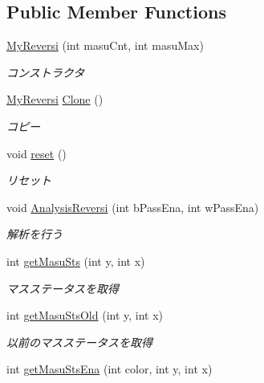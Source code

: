 \subsection*{Public Member Functions}
\begin{DoxyCompactItemize}
\item 
\hyperlink{class_reversi_form_1_1_my_reversi_ab8c7a345a2e1d0978afd640d052f3827}{My\+Reversi} (int masu\+Cnt, int masu\+Max)
\begin{DoxyCompactList}\small\item\em コンストラクタ \end{DoxyCompactList}\item 
\hyperlink{class_reversi_form_1_1_my_reversi}{My\+Reversi} \hyperlink{class_reversi_form_1_1_my_reversi_aa340f79c0f7bb78750c410ce73ca7b99}{Clone} ()
\begin{DoxyCompactList}\small\item\em コピー \end{DoxyCompactList}\item 
void \hyperlink{class_reversi_form_1_1_my_reversi_aa8d8e839466c63462954080353cd4a9e}{reset} ()
\begin{DoxyCompactList}\small\item\em リセット \end{DoxyCompactList}\item 
void \hyperlink{class_reversi_form_1_1_my_reversi_afc9513cbba4f973c7d1ee92e0a0f3288}{Analysis\+Reversi} (int b\+Pass\+Ena, int w\+Pass\+Ena)
\begin{DoxyCompactList}\small\item\em 解析を行う \end{DoxyCompactList}\item 
int \hyperlink{class_reversi_form_1_1_my_reversi_ab6498c154199b58c418af1e0058736f6}{get\+Masu\+Sts} (int y, int x)
\begin{DoxyCompactList}\small\item\em マスステータスを取得 \end{DoxyCompactList}\item 
int \hyperlink{class_reversi_form_1_1_my_reversi_abd6f4b9d6355af3175ac885731338705}{get\+Masu\+Sts\+Old} (int y, int x)
\begin{DoxyCompactList}\small\item\em 以前のマスステータスを取得 \end{DoxyCompactList}\item 
int \hyperlink{class_reversi_form_1_1_my_reversi_ae8404068c47751d53c4b430d635a1bb2}{get\+Masu\+Sts\+Ena} (int color, int y, int x)

\end{DoxyCompactItemize}
